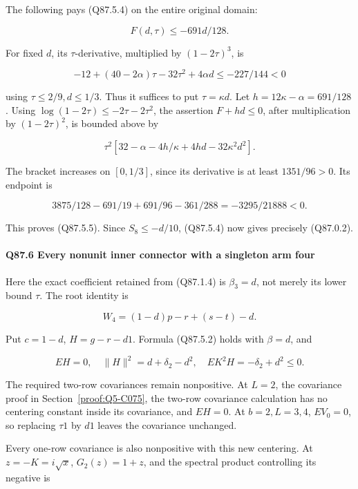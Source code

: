 The following pays (Q87.5.4) on the entire original domain:

\[
 F(d,\tau)\le-691d/128.
 \tag{Q87.5.5}\label{eq:Q87:5.5}
\]

For fixed \(d\), its \(\tau\)-derivative, multiplied by
\((1-2\tau)^3\), is

\[
 -12+(40-2\alpha)\tau-32\tau^2+4\alpha d
 \le-227/144<0
\]

using \(\tau\le\allowbreak 2/9,\allowbreak  d\le\allowbreak 1/3\). Thus it suffices to put
\(\tau=\allowbreak \kappa d\). Let \(h=\allowbreak 12\kappa-\alpha=\allowbreak 691/128\).
Using \(\log(1-2\tau)\le\allowbreak -2\tau-2\tau^2\), the assertion
\(F+hd\le\allowbreak 0\), after multiplication by \((1-2\tau)^2\), is
bounded above by

\[
 \tau^2[32-\alpha-4h/\kappa+4hd-32\kappa^2d^2].
\]

The bracket increases on \([0,\allowbreak  1/3]\), since its derivative is at
least \(1351/96>\allowbreak 0\). Its endpoint is

\[
 3875/128-691/19+691/96-361/288=-3295/21888<0.
\]

This proves (Q87.5.5).
Since \(S_8\le\allowbreak -d/10\), (Q87.5.4) now gives precisely (Q87.0.2).

\paragraph{Q87.6 Every nonunit inner connector with a singleton arm four}\label{part:Q87.6}

Here the exact coefficient retained from (Q87.1.4) is \(\beta_3=\allowbreak d\),
not merely its lower bound \(\tau\). The root identity is

\[
 W_4=(1-d)p-r+(s-t)-d.
\]

Put \(c=\allowbreak 1-d\), \(H=\allowbreak g-r-d1\). Formula (Q87.5.2) holds with
\(\beta=\allowbreak d\), and

\[
 EH=0,\quad\|H\|^2=d+\delta_2-d^2,\quad EK^2H=-\delta_2+d^2\le0.
 \tag{Q87.6.1}\label{eq:Q87:6.1}
\]

The required two-row covariances remain nonpositive. At \(L=\allowbreak 2\),
the covariance proof in Section~\ref{proof:Q5-C075}, the two-row covariance calculation has no centering constant
inside its covariance, and \(EH=\allowbreak 0\). At \(b=\allowbreak 2,\allowbreak  L=\allowbreak 3,\allowbreak  4\), \(EV_0=\allowbreak 0\),
so replacing \(\tau1\) by \(d1\) leaves the covariance
unchanged.

Every one-row covariance is also nonpositive
with this new centering. At \(z=\allowbreak -K=\allowbreak i\sqrt x\), \(G_2(z)=\allowbreak 1+z\),
and the spectral product controlling its negative is

